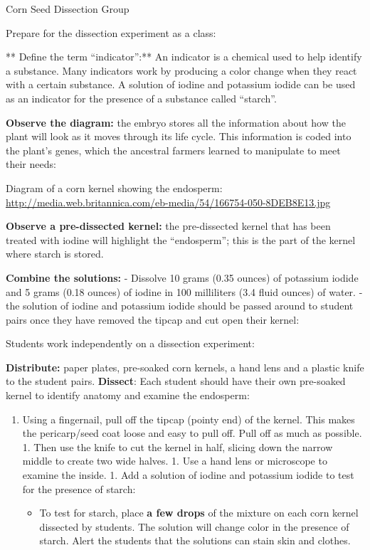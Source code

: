 \documentclass[12pt,]{article}
\providecommand{\tightlist}{%
  \setlength{\itemsep}{0pt}\setlength{\parskip}{0pt}}
\begin{document}
{Corn Seed Dissection Group}

Prepare for the dissection experiment as a class:

** Define the term ``indicator'':** An indicator is a chemical used to help identify a substance. Many indicators work by producing a color change when they react with a certain substance. A solution of iodine and potassium iodide can be used as an indicator for the presence of a substance called ``starch''.

\textbf{Observe the diagram:} the embryo stores all the information about how the plant will look as it moves through its life cycle. This information is coded into the plant's genes, which the ancestral farmers learned to manipulate to meet their needs:

Diagram of a corn kernel showing the endosperm: \url{http://media.web.britannica.com/eb-media/54/166754-050-8DEB8E13.jpg}

\textbf{Observe a pre-dissected kernel:} the pre-dissected kernel that has been treated with iodine will highlight the ``endosperm''; this is the part of the kernel where starch is stored.

\textbf{Combine the solutions: }
- Dissolve 10 grams (0.35 ounces) of potassium iodide and 5 grams (0.18 ounces) of iodine in 100 milliliters (3.4 fluid ounces) of water.
- the solution of iodine and potassium iodide should be passed around to student pairs once they have removed the tipcap and cut open their kernel:

Students work independently on a dissection experiment:

\textbf{Distribute:} paper plates, pre-soaked corn kernels, a hand lens and a plastic knife to the student pairs.
\textbf{Dissect}: Each student should have their own pre-soaked kernel to identify anatomy and examine the endosperm:

\begin{enumerate}
\def\labelenumi{\arabic{enumi}.}
\tightlist
\item
  Using a fingernail, pull off the tipcap (pointy end) of the kernel. This makes the pericarp/seed coat loose and easy to pull off. Pull off as much as possible.
  1. Then use the knife to cut the kernel in half, slicing down the narrow middle to create two wide halves.
  1. Use a hand lens or microscope to examine the inside.
  1. Add a solution of iodine and potassium iodide to test for the presence of starch:

  \begin{itemize}
  \tightlist
  \item
    To test for starch, place \textbf{a few drops} of the mixture on each corn kernel dissected by students. The solution will change color in the presence of starch. Alert the students that the solutions can stain skin and clothes.
  \end{itemize}
\end{enumerate}
\end{document}
